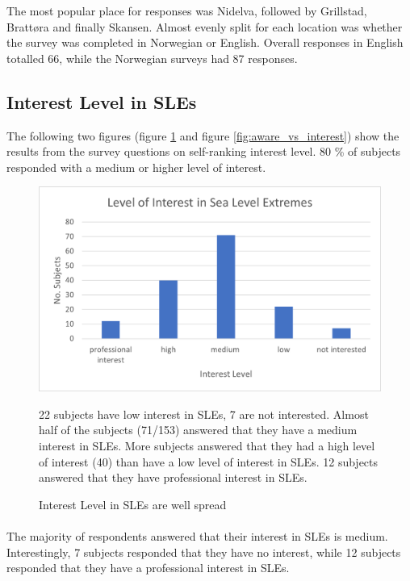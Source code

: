 The most popular place for responses was Nidelva, followed by Grillstad, Brattøra and finally Skansen. Almost evenly split for each location was whether the survey was completed in Norwegian or English. Overall responses in English totalled 66, while the Norwegian surveys had 87 responses.  

\subsection{Interest Level in SLEs}
The following two figures (figure \ref{fig:interest_level_SLE} and figure \ref{fig:aware_vs_interest}) show the results from the survey questions on self-ranking interest level. 80 \% of subjects responded with a medium or higher level of interest. 


\begin{figure}[H]
    \centering
    \includegraphics{fig_results/interest-level.png}
    \caption{Interest Level in SLEs are well spread}{22 subjects have low interest in SLEs, 7 are not interested.  Almost half of the subjects (71/153) answered that they have a medium interest in SLEs. More subjects answered that they had a high level of interest (40) than have a low level of interest in SLEs. 12 subjects answered that they have professional interest in SLEs. }
    \label{fig:interest_level_SLE}
\end{figure}
\paragraph{}

The majority of respondents answered that their interest in SLEs is medium. Interestingly, 7 subjects responded that they have no interest, while 12 subjects responded that they have a professional interest in SLEs. 
